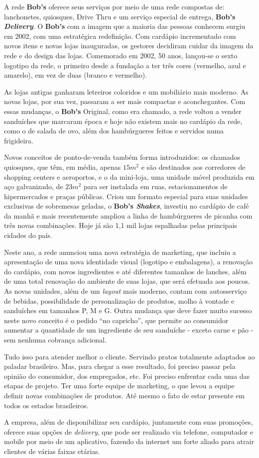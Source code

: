 		A rede \textbf{Bob’s} oferece seus serviços por meio de uma rede compostas de: lanchonetes, quiosques, Drive Thru e um serviço especial de entrega, \textbf{Bob’s \emph{Delivery}}. O \textbf{Bob’s} com a imagem que a maioria das pessoas conhecem surgiu em 2002, com uma estratégica redefinição. Com cardápio incrementado com novos itens e novas lojas inauguradas, os gestores decidiram cuidar da imagem da rede e do design das lojas. Comemorado em 2002, 50 anos, lançou-se o sexto logotipo da rede, o primeiro desde a fundação a ter três cores (vermelho, azul e amarelo), em vez de duas (branco e vermelho). 

		As lojas antigas ganharam letreiros coloridos e um mobiliário mais moderno. As novas lojas, por sua vez, passaram a ser mais compactas e aconchegantes. Com essas mudanças, o \textbf{Bob’s} Original, como era chamado, a rede voltou a vender sanduíches que marcaram época e hoje não existem mais no cardápio da rede, como o de salada de ovo, além dos hambúrgueres feitos e servidos numa frigideira.

		Novos conceitos de ponto-de-venda também forma introduzidos: os chamados quiosques, que têm, em média, apenas $15 m^2$ e são destinados aos corredores de shopping centers e aeroportos, e o da mini-loja, uma unidade móvel produzida em aço galvanizado, de $23 m^2$ para ser instalada em ruas, estacionamentos de hipermercados e praças públicas. Criou um formato especial para suas unidades exclusivas de sobremesas geladas, o \textbf{Bob’s \emph{Shakes}}, investiu no cardápio de café da manhã e mais recentemente ampliou a linha de hambúrgueres de picanha com três novas combinações. Hoje já são 1,1 mil lojas espalhadas pelas principais cidades do país. \cite{lamonica}

		Neste ano, a rede anunciou uma nova estratégia de marketing, que incluiu a apresentação de uma nova identidade visual (logotipo e embalagens), a renovação do cardápio, com novos ingredientes e até diferentes tamanhos de lanches, além de uma total renovação do ambiente de suas lojas, que será efetuada aos poucos. As novas unidades, além de um \emph{layout} mais moderno, contam com autosserviço de bebidas, possibilidade de personalização de produtos, molho à vontade e sanduíches em tamanhos P, M e G. Outra mudança que deve fazer muito sucesso neste novo conceito é o pedido “no capricho”, que permite ao consumidor aumentar a quantidade de um ingrediente de seu sanduíche - exceto carne e pão - sem nenhuma cobrança adicional.

		Tudo isso para atender melhor o cliente. Servindo pratos totalmente adaptados ao paladar brasileiro. Mas, para chegar a esse resultado, foi preciso passar pela opinião do consumidor, dos empregados, etc. Foi preciso enfrentar cada uma das etapas de projeto. Ter uma forte equipe de marketing, o que levou a equipe definir novas combinações de produtos. Até mesmo o fato de estar presente em todos os estados brasileiros. 

		A empresa, além de disponibilizar seu cardápio, juntamente com suas promoções, oferece suas opções de \emph{delivery}, que pode ser realizado via telefone, computador e mobile por meio de um aplicativo, fazendo da internet um forte aliado para atrair clientes de várias faixas etárias. 